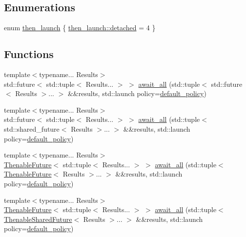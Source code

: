 \subsection*{Enumerations}
\begin{DoxyCompactItemize}
\item 
enum \hyperlink{namespacethenable_adf31291b806157ad914943dae5b3c94e}{then\+\_\+launch} \{ \hyperlink{namespacethenable_adf31291b806157ad914943dae5b3c94eab0398fd2e0c78072a48131f810266119}{then\+\_\+launch\+::detached} = 4
 \}
\end{DoxyCompactItemize}
\subsection*{Functions}
\begin{DoxyCompactItemize}
\item 
{\footnotesize template$<$typename... Results$>$ }\\std\+::future$<$ std\+::tuple$<$ Results... $>$ $>$ \hyperlink{namespacethenable_a37ee216d9dc5925d9b29253d2995aa61}{await\+\_\+all} (std\+::tuple$<$ std\+::future$<$ Results $>$... $>$ \&\&results, std\+::launch policy=\hyperlink{namespacethenable_a55a20a452e9ba9c0eff946d9b8636f06}{default\+\_\+policy})
\item 
{\footnotesize template$<$typename... Results$>$ }\\std\+::future$<$ std\+::tuple$<$ Results... $>$ $>$ \hyperlink{namespacethenable_a25eb0856c1e74aa180ab2b0d37313ef2}{await\+\_\+all} (std\+::tuple$<$ std\+::shared\+\_\+future$<$ Results $>$... $>$ \&\&results, std\+::launch policy=\hyperlink{namespacethenable_a55a20a452e9ba9c0eff946d9b8636f06}{default\+\_\+policy})
\item 
{\footnotesize template$<$typename... Results$>$ }\\\hyperlink{classthenable_1_1_thenable_future}{Thenable\+Future}$<$ std\+::tuple$<$ Results... $>$ $>$ \hyperlink{namespacethenable_a8b68e9ecc3341f793b7d5d83546c360c}{await\+\_\+all} (std\+::tuple$<$ \hyperlink{classthenable_1_1_thenable_future}{Thenable\+Future}$<$ Results $>$... $>$ \&\&results, std\+::launch policy=\hyperlink{namespacethenable_a55a20a452e9ba9c0eff946d9b8636f06}{default\+\_\+policy})
\item 
{\footnotesize template$<$typename... Results$>$ }\\\hyperlink{classthenable_1_1_thenable_future}{Thenable\+Future}$<$ std\+::tuple$<$ Results... $>$ $>$ \hyperlink{namespacethenable_aa67b5bd21ea878bcfabf190dc53f3b93}{await\+\_\+all} (std\+::tuple$<$ \hyperlink{classthenable_1_1_thenable_shared_future}{Thenable\+Shared\+Future}$<$ Results $>$... $>$ \&\&results, std\+::launch policy=\hyperlink{namespacethenable_a55a20a452e9ba9c0eff946d9b8636f06}{default\+\_\+policy})

\end{DoxyCompactItemize}
